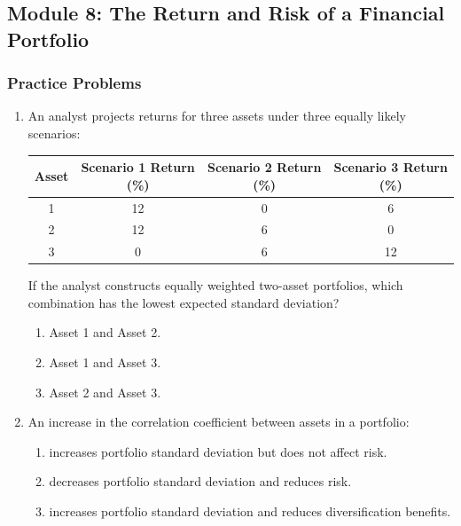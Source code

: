 \newpage

\subsection{Module 8: The Return and Risk of a Financial Portfolio}
\label{sec:app_Problems_M8}

\subsubsection{Practice Problems}
\label{subsec:app_Problems_M8}

\begin{enumerate}
	\item An analyst projects returns for three assets under three equally likely scenarios:
	      \begin{center}
	      \begin{tabular}{c  c  c  c}
		      \toprule
		      \textbf{Asset} & \textbf{Scenario 1 Return (\%)} & \textbf{Scenario 2 Return (\%)} & \textbf{Scenario 3 Return (\%)} \\
		      \midrule
		      1 & 12 & 0 & 6 \\
		      2 & 12 & 6 & 0 \\
		      3 & 0 & 6 & 12 \\
		      \bottomrule
	      \end{tabular}
	      \end{center}
	      If the analyst constructs equally weighted two-asset portfolios, which combination has the lowest expected standard deviation?
	      \begin{enumerate}[label=\Alph*.]
		      \item Asset 1 and Asset 2.
		      \item Asset 1 and Asset 3.
		      \item Asset 2 and Asset 3.
	      \end{enumerate}

	\item An increase in the correlation coefficient between assets in a portfolio:
	      \begin{enumerate}[label=\Alph*.]
		      \item increases portfolio standard deviation but does not affect risk.
		      \item decreases portfolio standard deviation and reduces risk.
		      \item increases portfolio standard deviation and reduces diversification benefits.
	      \end{enumerate}


\end{enumerate}
